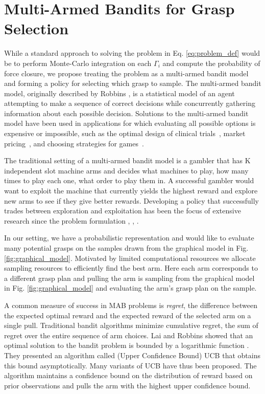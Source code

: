 \documentclass[journal,transmag]{IEEEtran}%
\begin{document}
\section{Multi-Armed Bandits for Grasp Selection}
While a standard approach to solving the problem in Eq. \ref{eq:problem_def} would be to perform Monte-Carlo integration on each $\Gamma_i$ and compute the probability of force closure, we propose treating the problem as a multi-armed bandit model and forming a policy for selecting which grasp to sample. The multi-armed bandit model, originally described by Robbins \cite{robbins1985some}, is a statistical model of an agent attempting to make a sequence of correct decisions while concurrently gathering information about each possible decision. Solutions to the multi-armed bandit model have been used in applications for which evaluating all possible options is expensive or impossible, such as the optimal design of clinical trials~\cite{simon1989optimal}, market pricing~\cite{rothschild1974two}, and choosing strategies for games~\cite{st2012online}. 

The traditional setting of a multi-armed bandit model is a gambler that has K independent slot machine arms and decides what machines to play, how many times to play each one, what order to play them in.
A successful gambler would want to exploit the machine that currently yields the highest reward and explore new arms to see if they give better rewards.
Developing a policy that successfully trades between exploration and exploitation has been the focus of extensive research since the problem formulation \cite{bubeck2009pure}, \cite{robbins1985some}, \cite{bergemann2006bandit}.

In our setting, we have a probabilistic  representation and would like to evaluate many potential grasps on the samples drawn from the graphical model in Fig. \ref{fig:graphical_model}.
Motivated by limited computational resources we  allocate sampling resources to efficiently find the best arm.
Here each arm corresponds to a different grasp plan and pulling the arm is sampling from the graphical model in Fig. \ref{fig:graphical_model} and evaluating the arm's grasp plan on the sample.



A common measure of success in MAB problems is {\it regret}, the difference between the expected optimal reward and the expected reward of the selected arm on a single pull.
Traditional bandit algorithms minimize cumulative regret,  the sum of regret over the entire sequence of arm choices. Lai and Robbins showed that an optimal solution to the bandit problem is bounded by a logarithmic function \cite{lai1985asymptotically}. They presented an algorithm called (Upper Confidence Bound) UCB that obtains this bound asymptotically. Many variants of UCB have thus been proposed. The algorithm maintains a confidence bound on the distribution of reward based on prior observations and pulls the arm with the highest upper confidence bound. 
\end{document}
